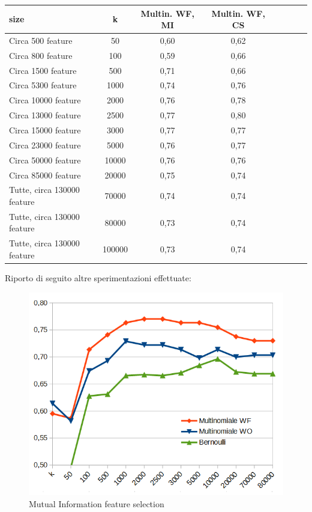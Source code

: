 \documentclass{article}
\theoremstyle{plain}
\theoremstyle{definition}
\begin{document}
\begin{tabular}{l*{6}{c}r}
size & k & Multin. WF, MI & Multin. WF, CS \\
\hline
Circa 500 feature & 50 & 0,60 & 0,62 \\
Circa 800 feature & 100 & 0,59 & 0,66 \\
Circa 1500 feature & 500 & 0,71 & 0,66 \\
Circa 5300 feature & 1000 & 0,74 & 0,76 \\
Circa 10000 feature & 2000 & 0,76 & 0,78 \\
Circa 13000 feature & 2500 & 0,77 & 0,80 \\
Circa 15000 feature & 3000 & 0,77 & 0,77 \\
Circa 23000 feature & 5000 & 0,76 & 0,77 \\
Circa 50000 feature & 10000 & 0,76 & 0,76 \\
Circa 85000 feature & 20000 & 0,75 & 0,74 \\
Tutte, circa 130000 feature & 70000 & 0,74 & 0,74 \\
Tutte, circa 130000 feature & 80000 & 0,73 & 0,74 \\
Tutte, circa 130000 feature & 100000 & 0,73 & 0,74 \\
\end{tabular}
\newpage
Riporto di seguito altre sperimentazioni effettuate:
\begin{figure}[htbp]
\begin{center}
\includegraphics[scale=0.55]{img/gr2.png}
\caption{Mutual Information feature selection}
\end{center}
\end{figure}
\end{document}

